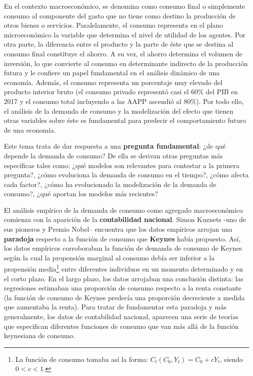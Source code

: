 \documentclass{nuevotema}
\begin{document}
\ideaclave

En el contexto macroeconómico, se denomina como consumo final o simplemente consumo al componente del gasto que no tiene como destino la producción de otros bienes o servicios. Paralelamente, el consumo representa en el plano microeconómico la variable que determina el nivel de utilidad de los agentes. Por otra parte, la diferencia entre el producto y la parte de éste que se destina al consumo final constituye el ahorro. A su vez, el ahorro determina el volumen de inversión, lo que convierte al consumo en determinante indirecto de la producción futura y le confiere un papel fundamental en el análisis dinámico de una economía. Además, el consumo representa un porcentaje muy elevado del producto interior bruto (el consumo privado representó casi el 60\% del PIB en 2017 y el consumo total incluyendo a las AAPP ascendió al 80\%). Por todo ello, el análisis de la demanda de consumo y la modelización del efecto que tienen otras variables sobre éste es fundamental para predecir el comportamiento futuro de una economía.

Este tema trata de dar respuesta a una \textbf{pregunta fundamental}: ¿de qué depende la demanda de consumo? De ella se derivan otras preguntas más específicas tales como: ¿qué modelos son relevantes para contestar a la primera pregunta?, ¿cómo evoluciona la demanda de consumo en el tiempo?, ¿cómo afecta cada factor?, ¿cómo ha evolucionado la modelización de la demanda de consumo?, ¿qué aportan los modelos más recientes?

El análisis empírico de la demanda de consumo como agregado macroeconómico comienza con la aparición de la \textbf{contabilidad nacional}. Simon Kuznets -uno de sus pioneros y Premio Nobel-- encuentra que los datos empíricos arrojan una \textbf{paradoja} respecto a la función de consumo que \textbf{Keynes} había propuesto. Así, los datos empíricos corroboraban la función de demanda de consumo de Keynes según la cual la propensión marginal al consumo debía ser inferior a la propensión media\footnote{La función de consumo tomaba así la forma: $C_t (C_0, Y_t) = C_0 + c Y_t$, siendo $0<c<1$.} entre diferentes individuos en un momento determinado y en el corto plazo. En el largo plazo, los datos arrojaban una conclusión distinta: las regresiones estimaban una proporción de consumo respecto a la renta constante (la función de consumo de Keynes predecía una proporción decreciente a medida que aumentaba la renta). Para tratar de fundamentar esta paradoja y más generalmente, los datos de contabilidad nacional, aparecen una serie de teorías que especifican diferentes funciones de consumo que van más allá de la función keynesiana de consumo.
\end{document}
